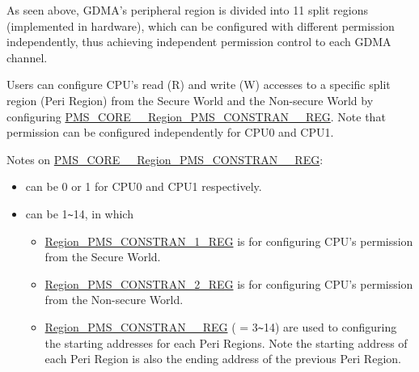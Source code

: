 \documentclass[main\_\_EN.tex]{subfiles}
\begin{document}
As seen above, GDMA's peripheral region is divided into 11 split regions (implemented in hardware), which can be configured with different permission independently, thus achieving independent permission control to each GDMA channel.

Users can configure CPU's read (R) and write (W) accesses to a specific split region (Peri Region) from the Secure World and the Non-secure World by configuring \hyperref[regdesc:PMSCORE0REGIONPMSCONSTRAIN1REG]{PMS\_CORE\_\_Region\_PMS\_CONSTRAN\_\_REG}. Note that permission can be configured independently for CPU0 and CPU1.

Notes on \hyperref[regdesc:PMSCORE0REGIONPMSCONSTRAIN1REG]{PMS\_CORE\_\_Region\_PMS\_CONSTRAN\_\_REG}:
\begin{itemize}
    \item {} can be 0 or 1 for CPU0 and CPU1 respectively.
    \item {} can be 1\verb+~+14, in which    \begin{itemize}
        \item \hyperref[regdesc:PMSCORE0REGIONPMSCONSTRAIN1REG]{Region\_PMS\_CONSTRAN\_1\_REG} is for configuring CPU's permission from the Secure World.
        \item \hyperref[regdesc:PMSCORE0REGIONPMSCONSTRAIN2REG]{Region\_PMS\_CONSTRAN\_2\_REG} is for configuring CPU's permission from the Non-secure World.
        \item \hyperref[regdesc:PMSCORE0REGIONPMSCONSTRAIN3REG]{Region\_PMS\_CONSTRAN\_\_REG} ( = 3\verb+~+14) are used to configuring the starting addresses for each Peri Regions. Note the starting address of each Peri Region is also the ending address of the previous Peri Region.
    \end{itemize}
\end{itemize}
\end{document}
